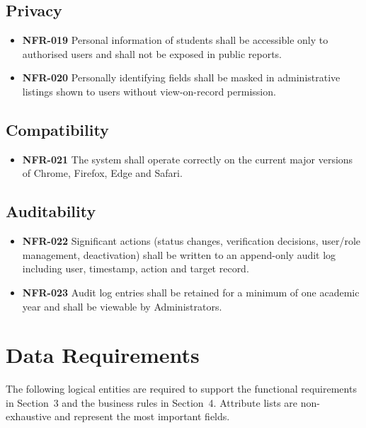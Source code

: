 \documentclass[11pt,a4paper]{article}
\begin{document}
\subsection{Privacy}
\begin{itemize}
  \item \textbf{NFR-019} Personal information of students shall be accessible only to authorised users and shall not be exposed in public reports.
  \item \textbf{NFR-020} Personally identifying fields shall be masked in administrative listings shown to users without view-on-record permission.
\end{itemize}

\subsection{Compatibility}
\begin{itemize}
  \item \textbf{NFR-021} The system shall operate correctly on the current major versions of Chrome, Firefox, Edge and Safari.
\end{itemize}

\subsection{Auditability}
\begin{itemize}
  \item \textbf{NFR-022} Significant actions (status changes, verification decisions, user/role management, deactivation) shall be written to an append-only audit log including user, timestamp, action and target record.
  \item \textbf{NFR-023} Audit log entries shall be retained for a minimum of one academic year and shall be viewable by Administrators.
\end{itemize}

\section{Data Requirements}
The following logical entities are required to support the functional
requirements in Section~3 and the business rules in Section~4. Attribute
lists are non-exhaustive and represent the most important fields.
\end{document}
